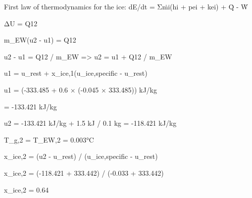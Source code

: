 First law of thermodynamics for the ice:  
dE/dt = Σṁi(hi + pei + kei) + Q̇ - Ẇ  

ΔU = Q12  

m_EW(u2 - u1) = Q12  

u2 - u1 = Q12 / m_EW => u2 = u1 + Q12 / m_EW  

u1 = u_rest + x_ice,1(u_ice,specific - u_rest)  

u1 = (-333.485 + 0.6 × (-0.045 × 333.485)) kJ/kg  

= -133.421 kJ/kg  

u2 = -133.421 kJ/kg + 1.5 kJ / 0.1 kg = -118.421 kJ/kg  

T_g,2 = T_EW,2 = 0.003°C  

x_ice,2 = (u2 - u_rest) / (u_ice,specific - u_rest)  

x_ice,2 = (-118.421 + 333.442) / (-0.033 + 333.442)  

x_ice,2 = 0.64